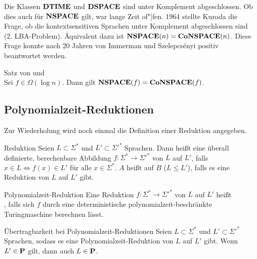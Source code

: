 \begin{Bem}
    Die Klassen $\DTIME$ und $\DSPACE$ sind unter Komplement abgeschlossen.
    Ob dies auch für $\NSPACE$ gilt, war lange Zeit of"|fen.
    1964 stellte Kuroda die Frage, ob die kontextsensitiven Sprachen unter Komplement
    abgeschlossen sind (2. LBA-Problem).
    Äquivalent dazu ist $\NSPACE(n) = \Co\NSPACE(n)$.
    Diese Frage konnte nach 20 Jahren von Immerman und Szelepcsényi positiv beantwortet werden.
\end{Bem}

\begin{Satz}{Satz von  und }\\
    Sei $f \in \Omega(\log n)$.
    Dann gilt $\NSPACE(f) = \Co\NSPACE(f)$.
\end{Satz}

\pagebreak

\subsection{%
    Polynomialzeit-Reduktionen%
}

\begin{Bem}
    Zur Wiederholung wird noch einmal die Definition einer Reduktion angegeben.
\end{Bem}

\begin{Def}{Reduktion}
    Seien $L \subset \Sigma^\ast$ und $L' \subset \Sigma'^\ast$ Sprachen.
    Dann heißt eine überall definierte, berechenbare Abbildung
    $f\colon \Sigma^\ast \rightarrow \Sigma'^\ast$  von $L$ auf $L'$, falls
    $x \in L \iff f(x) \in L'$ für alle $x \in \Sigma^\ast$.
    $A$ heißt auf $B$  ($L \le L'$), falls es eine Reduktion von $L$ auf $L'$
    gibt.
\end{Def}

\linie

\begin{Def}{Polynomialzeit-Reduktion}
    Eine Reduktion $f\colon \Sigma^\ast \rightarrow \Sigma'^\ast$ von $L$ auf $L'$ heißt\\
    , falls sich $f$ durch eine
    deterministische polynomialzeit-beschränkte Turingmaschine berechnen lässt.
\end{Def}

\begin{Satz}{Übertragbarkeit bei Polynomialzeit-Reduktionen}
    Seien $L \subset \Sigma^\ast$ und $L' \subset \Sigma'^\ast$ Sprachen,
    sodass es eine Polynomialzeit-Reduktion von $L$ auf $L'$ gibt.
    Wenn $L' \in \P$ gilt, dann auch $L \in \P$.
\end{Satz}

